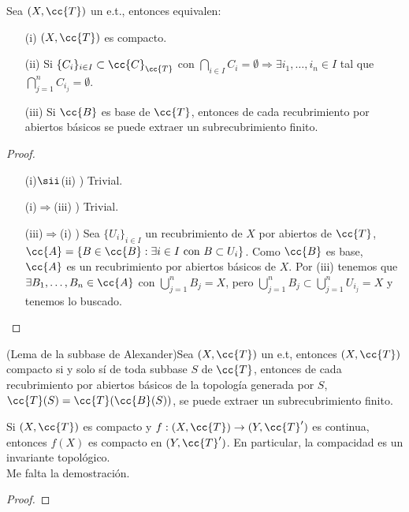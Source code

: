 \begin{prop}
    Sea $(X, \cc{T})$ un e.t., entonces equivalen:
    \begin{enumerate}
        \item[(i)] $(X, \cc{T})$ es compacto.
        \item[(ii)] Si $\{C_i\}_{i\in I} \subset \cc{C}_{\cc{T}}$ con $\bigcap\limits_{i\in I}C_i = \emptyset \Rightarrow \exists i_1,\dots,i_n\in I$ tal que $\bigcap\limits_{j=1}^n C_{i_j}=\emptyset$.
        \item[(iii)] Si $\cc{B}$ es base de $\cc{T}$, entonces de cada recubrimiento por abiertos básicos se puede extraer un subrecubrimiento finito.
    \end{enumerate}
    \begin{proof}\
        \begin{itemize}
            \item[(i)$\sii$(ii) )] Trivial.
            \item[(i)$\Rightarrow$(iii) )] Trivial.
            \item[(iii)$\Rightarrow$(i) )] Sea $\{U_i\}_{i\in I}$ un recubrimiento de $X$ por abiertos de $\cc{T}$, $\cc{A}=\{B\in \cc{B} : \exists i \in I \text{ con }B\subset U_i\}$. Como $\cc{B}$ es base, $\cc{A}$ es un recubrimiento por abiertos básicos de $X$. Por (iii) tenemos que $\exists B_1,\dots,B_n\in \cc{A}$ con $\bigcup\limits_{j=1}^n B_j = X$, pero $\bigcup\limits_{j=1}^n B_j \subset \bigcup\limits_{j=1}^n U_{i_j} = X$ y tenemos lo buscado.
        \end{itemize}
    \end{proof}
\end{prop}

\begin{lema}
    (Lema de la subbase de Alexander)Sea $(X, \cc{T})$ un e.t, entonces $(X, \cc{T})$ compacto si y solo sí de toda subbase $S$ de $\cc{T}$, entonces de cada recubrimiento por abiertos básicos de la topología generada por $S$, $\cc{T}(S) = \cc{T}(\cc{B}(S))$, se puede extraer un subrecubrimiento finito.
    \endsquare %
\end{lema}

\begin{prop}
    Si $(X, \cc{T})$ es compacto y $f:(X, \cc{T})\to (Y, \cc{T}')$ es continua, entonces $f(X)$ es compacto en $(Y, \cc{T}')$. En particular, la compacidad es un invariante topológico.\\


    Me falta la demostración.
    \begin{proof}
        
    \end{proof}

\end{prop}

